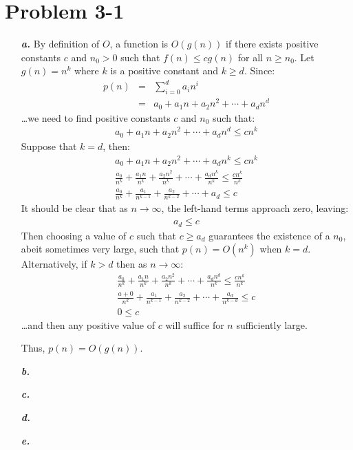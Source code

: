 \documentclass{article}
\begin{document}
\section*{Problem 3-1}

\noindent\begin{enumerate}
	\item[\textbf{\textit{a.}}] By definition of $O$, a function is $O(g(n))$ if there exists positive constants $c$ and $n_0 > 0$ such that $f(n) \leq c g(n)$ for all $n \geq n_0$. Let $g(n) = n^k$ where $k$ is a positive constant and $k \geq d$. Since:
		\begin{eqnarray*}
			p(n) & = & \sum_{i=0}^d a_i n^i \\
			& = & a_0 + a_1 n + a_2 n^2 + \cdots + a_d n^d
		\end{eqnarray*}
		\ldots we need to find positive constants $c$ and $n_0$ such that:
		\begin{eqnarray*}
			a_0 + a_1 n + a_2 n^2 + \cdots + a_d n^d \leq c n^k
		\end{eqnarray*}
		Suppose that $k = d$, then:
		\begin{eqnarray*}
			a_0 + a_1 n + a_2 n^2 + \cdots + a_d n^k \leq c n^k \\
			\frac{a_0}{n^k} + \frac{a_1 n}{n^k} + \frac{a_2 n^2}{n^k} + \cdots + \frac{a_d n^k}{n^k} \leq \frac{c n^k}{n^k} \\
			\frac{a_0}{n^k} + \frac{a_1}{n^{k-1}} + \frac{a_2}{n^{k-2}} + \cdots + a_d \leq c
		\end{eqnarray*}
		It should be clear that as $n \rightarrow \infty$, the left-hand terms approach zero, leaving:
		\begin{eqnarray*}
			a_d \leq c
		\end{eqnarray*}
		Then choosing a value of $c$ such that $c \geq a_d$ guarantees the existence of a $n_0$, abeit sometimes very large, such that $p(n) = O(n^k)$ when $k = d$. Alternatively, if $k > d$ then as $n \rightarrow \infty$:
		\begin{eqnarray*}
			\frac{a_0}{n^k} + \frac{a_1 n}{n^k} + \frac{a_2 n^2}{n^k} + \cdots + \frac{a_d n^d}{n^k} \leq \frac{c n^k}{n^k} \\
			\frac{a+0}{n^k} + \frac{a_1}{n^{k-1}} + \frac{a_2}{n^{k-2}} + \cdots + \frac{a_d}{n^{k-d}} \leq c \\
			0 \leq c
		\end{eqnarray*}
		\ldots and then any positive value of $c$ will suffice for $n$ sufficiently large.
		
		Thus, $p(n) = O(g(n))$.
	\item[\textbf{\textit{b.}}]
	\item[\textbf{\textit{c.}}]
	\item[\textbf{\textit{d.}}] 
	\item[\textbf{\textit{e.}}]
\end{enumerate}
\end{document}
